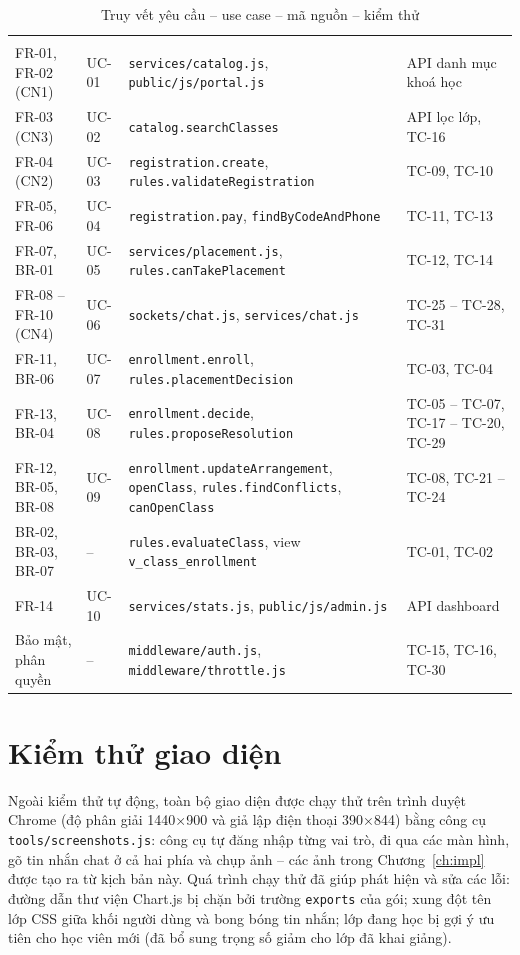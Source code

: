 \begin{xltabular}{\linewidth}{|L{2.7cm}|L{1.5cm}|Y|L{3.4cm}|}
  \caption{Truy vết yêu cầu – use case – mã nguồn – kiểm thử}\label{tab:trace}\\ \hline
  \headrow {} &  &  &  \\ \hline
  \endfirsthead \hline
  \headrow {} &  &  &  \\ \hline
  \endhead
  FR-01, FR-02 (CN1) & UC-01 & \texttt{services/catalog.js}, \texttt{public/js/portal.js} & API danh mục khoá học \\ \hline
  FR-03 (CN3) & UC-02 & \texttt{catalog.searchClasses} & API lọc lớp, TC-16 \\ \hline
  FR-04 (CN2) & UC-03 & \texttt{registration.create}, \texttt{rules.validateRegistration} & TC-09, TC-10 \\ \hline
  FR-05, FR-06 & UC-04 & \texttt{registration.pay}, \texttt{findByCodeAndPhone} & TC-11, TC-13 \\ \hline
  FR-07, BR-01 & UC-05 & \texttt{services/placement.js}, \texttt{rules.canTakePlacement} & TC-12, TC-14 \\ \hline
  FR-08 – FR-10 (CN4) & UC-06 & \texttt{sockets/chat.js}, \texttt{services/chat.js} & TC-25 – TC-28, TC-31 \\ \hline
  FR-11, BR-06 & UC-07 & \texttt{enrollment.enroll}, \texttt{rules.placementDecision} & TC-03, TC-04 \\ \hline
  FR-13, BR-04 & UC-08 & \texttt{enrollment.decide}, \texttt{rules.proposeResolution} & TC-05 – TC-07, TC-17 – TC-20, TC-29 \\ \hline
  FR-12, BR-05, BR-08 & UC-09 & \texttt{enrollment.updateArrangement}, \texttt{openClass}, \texttt{rules.findConflicts}, \texttt{canOpenClass} & TC-08, TC-21 – TC-24 \\ \hline
  BR-02, BR-03, BR-07 & – & \texttt{rules.evaluateClass}, view \texttt{v\_class\_enrollment} & TC-01, TC-02 \\ \hline
  FR-14 & UC-10 & \texttt{services/stats.js}, \texttt{public/js/admin.js} & API dashboard \\ \hline
  Bảo mật, phân quyền & – & \texttt{middleware/auth.js}, \texttt{middleware/throttle.js} & TC-15, TC-16, TC-30 \\ \hline
\end{xltabular}

\section{Kiểm thử giao diện}
Ngoài kiểm thử tự động, toàn bộ giao diện được chạy thử trên trình duyệt Chrome (độ phân giải 1440×900 và giả lập điện thoại 390×844) bằng công cụ \texttt{tools/screenshots.js}: công cụ tự đăng nhập từng vai trò, đi qua các màn hình, gõ tin nhắn chat ở cả hai phía và chụp ảnh – các ảnh trong Chương~\ref{ch:impl} được tạo ra từ kịch bản này. Quá trình chạy thử đã giúp phát hiện và sửa các lỗi: đường dẫn thư viện Chart.js bị chặn bởi trường \texttt{exports} của gói; xung đột tên lớp CSS giữa khối người dùng và bong bóng tin nhắn; lớp đang học bị gợi ý ưu tiên cho học viên mới (đã bổ sung trọng số giảm cho lớp đã khai giảng).
